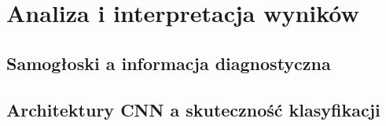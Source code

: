 \chapter{Analiza i interpretacja wyników}
\label{ch:interpretacja-wynikow}

\section{Samogłoski a informacja diagnostyczna\@}
\label{sec:samogloski-informacja-diagnostyczna}

\section{Architektury CNN a skuteczność klasyfikacji}
\label{sec:CNN-a-skutecznosc-klasyfikacji}



